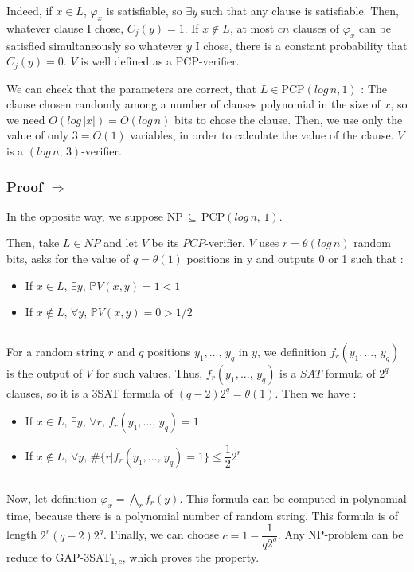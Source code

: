 Indeed, if $x \in L$, $\varphi_{x}$ is satisfiable, so $\exists y$ such that any clause is satisfiable. Then, whatever clause I chose, $C_{j}(y)=1$. If $x \notin L$, at most $cn$ clauses of $\varphi_{x}$ can be satisfied simultaneously so whatever $y$ I chose, there is a constant probability that $C_{j}(y)=0$. $V$ is well defined as a PCP-verifier.

We can check that the parameters are correct, that $L \in $PCP$(log\, n, 1)$ : The clause chosen randomly among a number of clauses polynomial in the size of $x$, so we need $O(log\,|x|)=O(log\,n)$ bits to chose the clause. Then, we use only the value of only $3=O(1)$ variables, in order to calculate the value of the clause. $V$ is a $(log\,n,\,3)$-verifier.

\subsubsection{Proof $\Longrightarrow$}
In the opposite way, we suppose NP$\,\subseteq\,$PCP$(log\,n,\,1)$.

Then, take $L \in NP$ and let $V$ be its $PCP$-verifier. $V$ uses $r=\theta (log\,n)$ random bits, asks for the value of $q=\theta (1)$ positions in y and outputs 0 or 1 such that :
\begin{itemize}
\item If $x \in L,\, \exists y,\, \mathbb{P}{V(x,y)=1}<1$
\item If $x \notin L,\, \forall y,\, \mathbb{P}{V(x,y)=0}>1/2$
\end{itemize}
$ $

For a random string $r$ and $q$ positions $y_{1},...,\,y_{q}$ in $y$, we definition $f_{r}(y_{1},...,\,y_{q})$ is the output of $V$ for such values. Thus, $f_{r}(y_{1},...,\,y_{q})$ is a $SAT$ formula of $2^q$ clauses, so it is a 3SAT formula of $(q-2)2^q=\theta(1)$. Then we have :
\begin{itemize}
\item If $x \in L,\, \exists y,\, \forall r,\,f_{r}(y_{1},...,\,y_{q})=1$
\item If $x \notin L,\, \forall y,\, \#\lbrace r|f_{r}(y_{1},...,\,y_{q})=1 \rbrace \leq \dfrac{1}{2} 2^r$
\end{itemize}
$ $

Now, let definition $\varphi_{x}=\bigwedge_{r}f_{r}(y)$. This formula can be computed in polynomial time, because there is a polynomial number of random string. This formula is of length $2^r(q-2)2^q$. Finally, we can choose $c=1-\dfrac{1}{q2^q}$. Any NP-problem can be reduce to GAP-3SAT$_{1,c}$, which proves the property.


